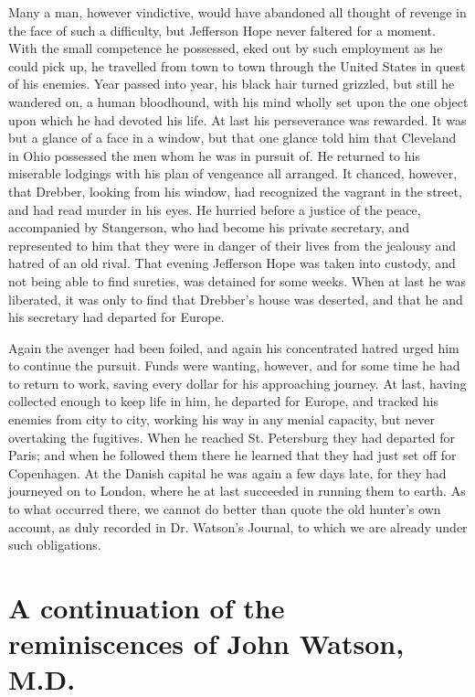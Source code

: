 \documentclass[12pt]{book}
\begin{document}
Many a man, however vindictive, would have abandoned all thought of revenge in the face of such a difficulty, but Jefferson Hope never faltered for a moment. With the small competence he possessed, eked out by such employment as he could pick up, he travelled from town to town through the United States in quest of his enemies. Year passed into year, his black hair turned grizzled, but still he wandered on, a human bloodhound, with his mind wholly set upon the one object upon which he had devoted his life. At last his perseverance was rewarded. It was but a glance of a face in a window, but that one glance told him that Cleveland in Ohio possessed the men whom he was in pursuit of. He returned to his miserable lodgings with his plan of vengeance all arranged. It chanced, however, that Drebber, looking from his window, had recognized the vagrant in the street, and had read murder in his eyes. He hurried before a justice of the peace, accompanied by Stangerson, who had become his private secretary, and represented to him that they were in danger of their lives from the jealousy and hatred of an old rival. That evening Jefferson Hope was taken into custody, and not being able to find sureties, was detained for some weeks. When at last he was liberated, it was only to find that Drebber’s house was deserted, and that he and his secretary had departed for Europe. 

Again the avenger had been foiled, and again his concentrated hatred urged him to continue the pursuit. Funds were wanting, however, and for some time he had to return to work, saving every dollar for his approaching journey. At last, having collected enough to keep life in him, he departed for Europe, and tracked his enemies from city to city, working his way in any menial capacity, but never overtaking the fugitives. When he reached St. Petersburg they had departed for Paris; and when he followed them there he learned that they had just set off for Copenhagen. At the Danish capital he was again a few days late, for they had journeyed on to London, where he at last succeeded in running them to earth. As to what occurred there, we cannot do better than quote the old hunter’s own account, as duly recorded in Dr. Watson’s Journal, to which we are already under such obligations. 







\chapter{A continuation of the reminiscences of John Watson, M.D.} 
\end{document}

